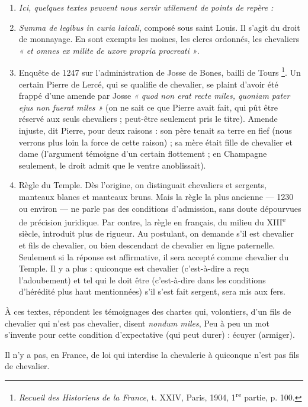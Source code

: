 \documentclass[french,twoside]{book} %
\newlength{\listmod}
\newcommand{\listhead}[1]{\hspace{-1\listmod}\emph{#1}}
\begin{document}
\begin{enumerate}[itemsep=0pt,]
\item[]\listhead{Ici, quelques textes peuvent nous servir utilement de points de repère :}
\item {\itshape Summa de legibus in curia laicali}, composé sous saint Louis. Il s’agit du droit de monnayage. En sont exempts les moines, les clercs ordonnés, les chevaliers \emph{« et omnes ex milite de uxore propria procreati »}.
\item Enquête de 1247 sur l’administration de Josse de Bones, bailli de Tours \footnote{{\itshape Recueil des Historiens de la France}, t. XXIV, Paris, 1904, 1\textsuperscript{re} partie, p. 100.}. Un certain Pierre de Lercé, qui se qualifie de chevalier, se plaint d’avoir été frappé d’une amende par Josse \emph{« quod non erat recte miles, quoniam pater ejus non fuerat miles »} (on ne sait ce que Pierre avait fait, qui pût être réservé aux seuls chevaliers ; peut-être seulement pris le titre). Amende injuste, dit Pierre, pour deux raisons : son père tenait sa terre en fief (nous verrons plus loin la force de cette raison) ; sa mère était fille de chevalier et dame (l’argument témoigne d’un certain flottement ; en Champagne seulement, le droit admit que le ventre anoblissait).
\item Règle du Temple. Dès l’origine, on distinguait chevaliers et sergents, manteaux blancs et manteaux bruns. Mais la règle la plus ancienne — 1230 ou environ — ne parle pas des conditions d’admission, sans doute dépourvues de précision juridique. Par contre, la règle en français, du milieu du XIII\textsuperscript{e} siècle, introduit plus de rigueur. Au postulant, on demande s’il est chevalier et fils de chevalier, ou bien descendant de chevalier en ligne paternelle. Seulement si la réponse est affirmative, il sera accepté comme chevalier du Temple. Il y a plus : quiconque est chevalier (c’est-à-dire a reçu l’adoubement) et tel qui le doit être (c’est-à-dire dans les conditions d’hérédité plus haut mentionnées) s’il s’est fait sergent, sera mis aux fers.

\end{enumerate}\noindent À ces textes, répondent les témoignages des chartes qui, volontiers, d’un fils de chevalier qui n’est pas chevalier, disent \emph{nondum miles}, Peu à peu un mot s’invente pour cette condition d’expectative (qui peut durer) : écuyer (armiger).\par
Il n’y a pas, en France, de loi qui interdise la chevalerie à quiconque n’est pas fils de chevalier.\par
\end{document}

